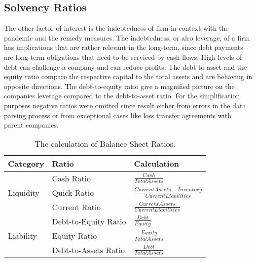 \subsection{Solvency Ratios}

The other factor of interest is the indebtedness of firm in context with the pandemic and the remedy measures. The indebtedness, or also leverage, of a firm has implications that are rather relevant in the long-term, since debt payments are long term obligations that need to be serviced by cash flows. High levels of debt can challenge a company and can reduce profits. 
The debt-to-asset and the equity ratio compare the respective capital to the total assets and are behaving in opposite directions. The debt-to-equity ratio give a magnified picture on the companies leverage compared to the debt-to-asset ratio. For the simplification purposes negative ratios were omitted since result either from errors in the data parsing process or from exceptional cases like loss transfer agreements with parent companies. 

\begin{table}[]
    \caption{The calculation of Balance Sheet Ratios.}
    \label{tab:RatioCalc}
    \centering
    \def\arraystretch{1.5}
    \begin{tabular}{@{}lll@{}}
    \toprule
    Category                   & Ratio                & Calculation \\ \midrule
    \multirow{3}{*}{Liquidity} & Cash Ratio           & $\frac{Cash}{Total Assets}$ \\ %
                                & Quick Ratio          & $\frac{Current Assets-Inventory}{Current Liabilities}$ \\ %
                                & Current Ratio        & $\frac{Current Assets}{Current Liabilities}$ \\ \midrule
    \multirow{3}{*}{Liability} & Debt-to-Equity Ratio & $\frac{Debt}{Equity}$ \\ %
                                & Equity Ratio         & $\frac{Equity}{Total Assets}$ \\ %
                                & Debt-to-Assets Ratio & $\frac{Debt}{Total Assets}$ \\ \bottomrule
    \end{tabular}
    \end{table}


